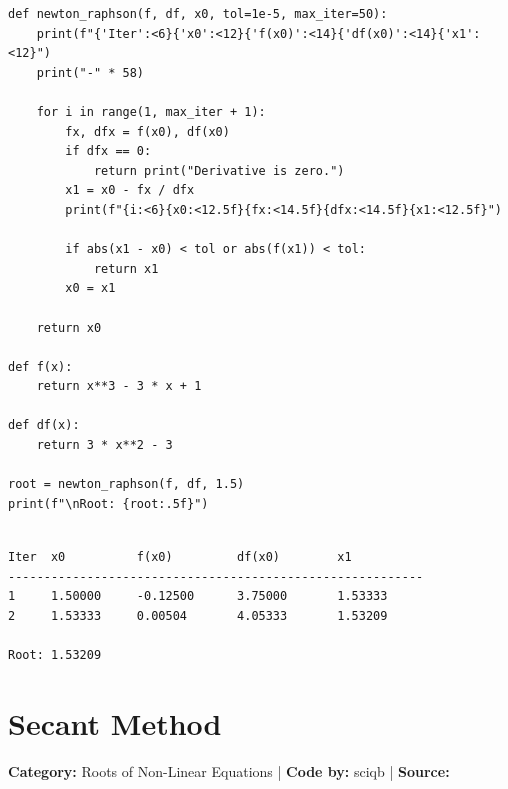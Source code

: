 \documentclass[10pt,a4paper]{report}
\begin{document}
\begin{tcolorbox}[colback=codebg,colframe=secondary,title=\textbf{Python Implementation (Step-by-Step Functions)},boxrule=1pt,arc=2mm]
\begin{lstlisting}[style=python_detailed]
def newton_raphson(f, df, x0, tol=1e-5, max_iter=50):
    print(f"{'Iter':<6}{'x0':<12}{'f(x0)':<14}{'df(x0)':<14}{'x1':<12}")
    print("-" * 58)

    for i in range(1, max_iter + 1):
        fx, dfx = f(x0), df(x0)
        if dfx == 0:
            return print("Derivative is zero.")
        x1 = x0 - fx / dfx
        print(f"{i:<6}{x0:<12.5f}{fx:<14.5f}{dfx:<14.5f}{x1:<12.5f}")

        if abs(x1 - x0) < tol or abs(f(x1)) < tol:
            return x1
        x0 = x1

    return x0

def f(x):
    return x**3 - 3 * x + 1

def df(x):
    return 3 * x**2 - 3

root = newton_raphson(f, df, 1.5)
print(f"\nRoot: {root:.5f}")


\end{lstlisting}
\end{tcolorbox}

\begin{tcolorbox}[colback=termbg,colframe=primary,title=\textbf{Program Execution Output \& Convergence Table},boxrule=1pt,arc=2mm]
\begin{lstlisting}[style=terminal_output]
Iter  x0          f(x0)         df(x0)        x1          
----------------------------------------------------------
1     1.50000     -0.12500      3.75000       1.53333     
2     1.53333     0.00504       4.05333       1.53209     

Root: 1.53209
\end{lstlisting}
\end{tcolorbox}

\newpage


\section{Secant Method}
\textbf{Category:} \textcolor{secondary}{Roots of Non-Linear Equations} \quad | \quad \textbf{Code by:} \textcolor{secondary}{sciqb} \quad | \quad \textbf{Source:} \texttt{}
\end{document}
